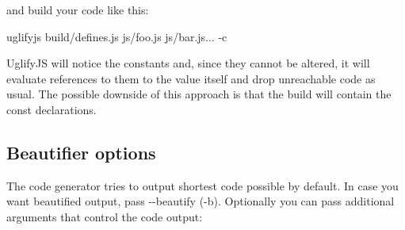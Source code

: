 and build your code like this\+: \begin{DoxyVerb}uglifyjs build/defines.js js/foo.js js/bar.js... -c
\end{DoxyVerb}


Uglify\+J\+S will notice the constants and, since they cannot be altered, it will evaluate references to them to the value itself and drop unreachable code as usual. The possible downside of this approach is that the build will contain the {\ttfamily const} declarations.

\label{_codegen-options}%
 \subsection*{Beautifier options}

The code generator tries to output shortest code possible by default. In case you want beautified output, pass {\ttfamily -\/-\/beautify} ({\ttfamily -\/b}). Optionally you can pass additional arguments that control the code output\+:


